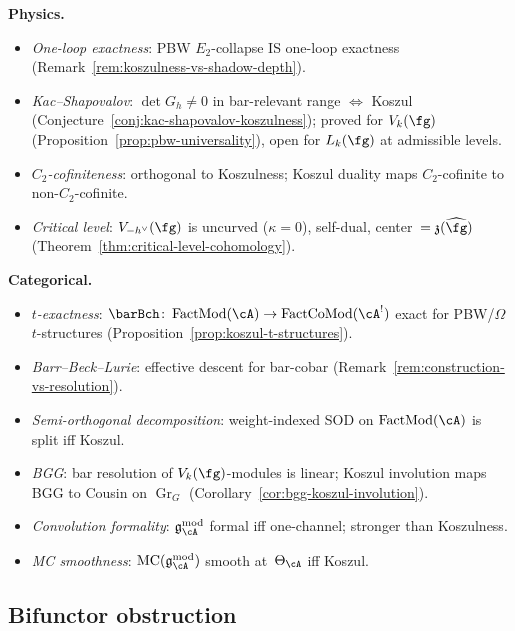 \smallskip\noindent\textbf{Physics.}
\begin{itemize}[nosep]
\item \emph{One-loop exactness}: PBW $E_2$-collapse IS one-loop exactness (Remark~\ref{rem:koszulness-vs-shadow-depth}).
\item \emph{Kac--Shapovalov}: $\det G_h \neq 0$ in bar-relevant range $\Leftrightarrow$ Koszul (Conjecture~\ref{conj:kac-shapovalov-koszulness}); proved for $V_k(\fg)$ (Proposition~\ref{prop:pbw-universality}), open for $L_k(\fg)$ at admissible levels.
\item \emph{$C_2$-cofiniteness}: orthogonal to Koszulness; Koszul duality maps $C_2$-cofinite to non-$C_2$-cofinite.
\item \emph{Critical level}: $V_{-h^\vee}(\fg)$ is uncurved ($\kappa=0$), self-dual, center~$= \mathfrak{z}(\widehat{\fg})$ (Theorem~\ref{thm:critical-level-cohomology}).
\end{itemize}

\smallskip\noindent\textbf{Categorical.}
\begin{itemize}[nosep]
\item \emph{$t$-exactness}: $\barBch \colon \operatorname{FactMod}(\cA) \to \operatorname{FactCoMod}(\cA^!)$ exact for PBW/$\Omega$ $t$-structures (Proposition~\ref{prop:koszul-t-structures}).
\item \emph{Barr--Beck--Lurie}: effective descent for bar-cobar (Remark~\ref{rem:construction-vs-resolution}).
\item \emph{Semi-orthogonal decomposition}: weight-indexed SOD on $\operatorname{FactMod}(\cA)$ is split iff Koszul.
\item \emph{BGG}: bar resolution of $V_k(\fg)$-modules is linear; Koszul involution maps BGG to Cousin on $\operatorname{Gr}_G$ (Corollary~\ref{cor:bgg-koszul-involution}).
\item \emph{Convolution formality}: $\mathfrak{g}_\cA^{\mathrm{mod}}$ formal iff one-channel; stronger than Koszulness.
\item \emph{MC smoothness}: $\operatorname{MC}(\mathfrak{g}_\cA^{\mathrm{mod}})$ smooth at~$\Theta_\cA$ iff Koszul.
\end{itemize}


\subsection{Bifunctor obstruction}
\label{subsec:concordance-bifunctor-obstruction}

